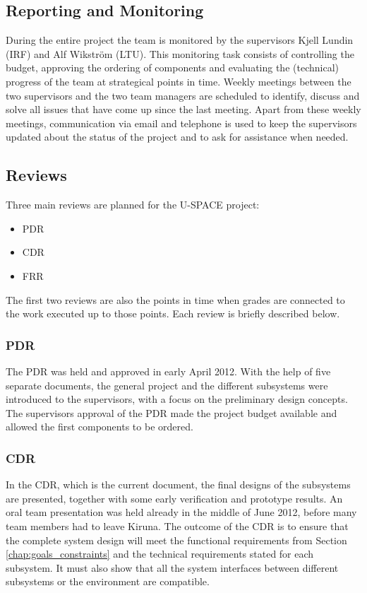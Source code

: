 \subsection{Reporting and Monitoring}
%
During the entire project the team is monitored by the supervisors Kjell Lundin (\ac{IRF}) and Alf Wikström (\ac{LTU}). This monitoring task consists of controlling the budget, approving the ordering of components and evaluating the (technical) progress of the team at strategical points in time. Weekly meetings between the two supervisors and the two team managers are scheduled to identify, discuss and solve all issues that have come up since the last meeting. Apart from these weekly meetings, communication via email and telephone is used to keep the supervisors updated about the status of the project and to ask for assistance when needed.

\subsection{Reviews}
%
Three main reviews are planned for the \ac{U-SPACE} project:

\begin{itemize}
\item \acl{PDR}
\item \acl{CDR}
\item \acl{FRR}
\end{itemize}
%
The first two reviews are also the points in time when grades are connected to the work executed up to those points. Each review is briefly described below.
%
\subsubsection*{\acl{PDR}}
The \ac{PDR} was held and approved in early April 2012. With the help of five separate documents, the general project and the different subsystems were introduced to the supervisors, with a focus on the preliminary design concepts. The supervisors approval of the \ac{PDR} made the project budget available and allowed the first components to be ordered.
%
\subsubsection*{\acl{CDR}}
In the \ac{CDR}, which is the current document, the final designs of the subsystems are presented, together with some early verification and prototype results. An oral team presentation was held already in the middle of June 2012, before many team members had to leave Kiruna. The outcome of the \ac{CDR} is to ensure that the complete system design will meet the functional requirements from Section \ref{chap:goals_constraints} and the technical requirements stated for each subsystem. It must also show that all the system interfaces between different subsystems or the environment are compatible.
%
